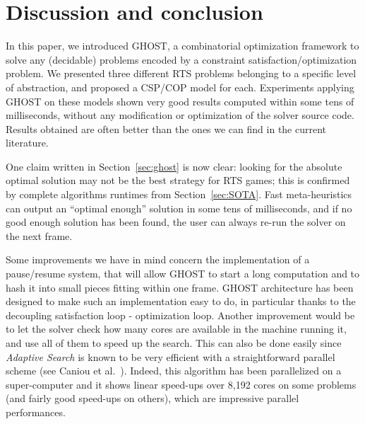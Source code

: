 \documentclass[journal]{IEEEtran}
\newcommand{\minormod}[1]{\color{red} #1\color{black} \xspace}
\newcommand{\csp}{\textsc{CSP}\xspace}
\newcommand{\cop}{\textsc{COP}\xspace}
\newcommand{\ghost}{\textsc{GHOST}\xspace}
\begin{document}
\section{Discussion and conclusion}\label{sec:conclusion}

In this paper, we introduced \ghost, a combinatorial optimization
framework to solve any \minormod{(decidable)} problems encoded by a constraint
satisfaction/optimization problem.  We presented three different RTS
problems belonging to a specific level of abstraction, and proposed a
\csp/\cop model for each. Experiments applying \ghost on these models
shown very good results computed within some tens of milliseconds,
without any modification or optimization of the solver source
code. Results obtained are often better than the ones we can find in
the current literature.

One claim written in Section~\ref{sec:ghost} is now clear: looking for
the absolute  optimal solution may  not be  the best strategy  for RTS
games; this is confirmed by complete algorithms runtimes from Section~\ref{sec:SOTA}.  Fast  meta-heuristics  can  output an  ``optimal
enough'' solution in some tens of  milliseconds, and if no good enough
solution has been found, the user can always re-run the solver on the
next frame.   %


Some  improvements we  have in  mind concern the implementation  of a
pause/resume system, that will allow  \ghost to start a  long computation and
to hash it into small pieces fitting  within one frame. %
\ghost architecture has been designed to make such an implementation
easy to do, in particular thanks to the decoupling satisfaction loop -
optimization loop. Another improvement would be to let the solver
check how many cores are available in the machine running it, and use
all of them to speed up the search. This can also be done easily since
{\it Adaptive Search} is known to be very efficient with a
straightforward parallel scheme (see Caniou et
al.~\cite{Caniou14}). Indeed, this algorithm has been parallelized on a
super-computer and it shows linear speed-ups over 8,192 cores on some
problems (and fairly good speed-ups on others), which are impressive
parallel performances.
\end{document}
